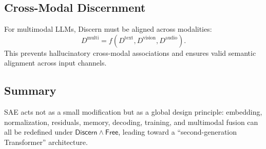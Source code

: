 \documentclass[11pt]{article}
\theoremstyle{plain}
\theoremstyle{definition}
\theoremstyle{remark}
\begin{document}
\subsection{Cross-Modal Discernment}
For multimodal LLMs, Discern must be aligned across modalities:
\[
  D^{\text{multi}} = f(D^{\text{text}}, D^{\text{vision}}, D^{\text{audio}}).
\]
This prevents hallucinatory cross-modal associations and ensures
valid semantic alignment across input channels.

\subsection*{Summary}
SAE acts not as a small modification but as a global design principle:
embedding, normalization, residuals, memory, decoding, training,
and multimodal fusion can all be redefined under
$\mathsf{Discern}\wedge \mathsf{Free}$,
leading toward a ``second-generation Transformer'' architecture.
\end{document}
